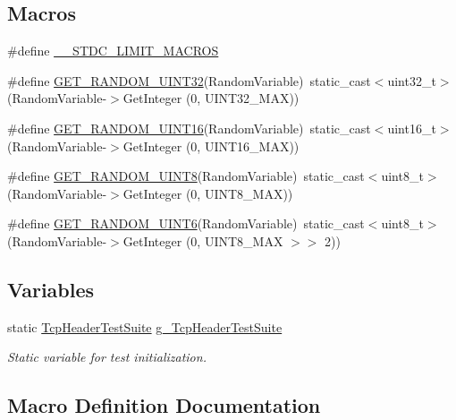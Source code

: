 \subsection*{Macros}
\begin{DoxyCompactItemize}
\item 
\#define \hyperlink{tcp-header-test_8cc_aeb7e7a856ab7a794b05b6b63ef36ea3e}{\+\_\+\+\_\+\+S\+T\+D\+C\+\_\+\+L\+I\+M\+I\+T\+\_\+\+M\+A\+C\+R\+OS}
\item 
\#define \hyperlink{tcp-header-test_8cc_a18a01a3931e95a479db69a3aa5ecb86b}{G\+E\+T\+\_\+\+R\+A\+N\+D\+O\+M\+\_\+\+U\+I\+N\+T32}(Random\+Variable)~static\+\_\+cast$<$uint32\+\_\+t$>$ (Random\+Variable-\/$>$Get\+Integer (0, U\+I\+N\+T32\+\_\+\+M\+AX))
\item 
\#define \hyperlink{tcp-header-test_8cc_a5ad9b850834e357fa799fbd61fdae700}{G\+E\+T\+\_\+\+R\+A\+N\+D\+O\+M\+\_\+\+U\+I\+N\+T16}(Random\+Variable)~static\+\_\+cast$<$uint16\+\_\+t$>$ (Random\+Variable-\/$>$Get\+Integer (0, U\+I\+N\+T16\+\_\+\+M\+AX))
\item 
\#define \hyperlink{tcp-header-test_8cc_a80bde0d6d461cee23c8fa13d12d15e16}{G\+E\+T\+\_\+\+R\+A\+N\+D\+O\+M\+\_\+\+U\+I\+N\+T8}(Random\+Variable)~static\+\_\+cast$<$uint8\+\_\+t$>$ (Random\+Variable-\/$>$Get\+Integer (0, U\+I\+N\+T8\+\_\+\+M\+AX))
\item 
\#define \hyperlink{tcp-header-test_8cc_a238b3bcc0c1ee2f728a775153422d52a}{G\+E\+T\+\_\+\+R\+A\+N\+D\+O\+M\+\_\+\+U\+I\+N\+T6}(Random\+Variable)~static\+\_\+cast$<$uint8\+\_\+t$>$ (Random\+Variable-\/$>$Get\+Integer (0, U\+I\+N\+T8\+\_\+\+M\+AX $>$$>$ 2))
\end{DoxyCompactItemize}
\subsection*{Variables}
\begin{DoxyCompactItemize}
\item 
static \hyperlink{classTcpHeaderTestSuite}{Tcp\+Header\+Test\+Suite} \hyperlink{tcp-header-test_8cc_a0e9b4c960e624eb8c6d054eb34af8fec}{g\+\_\+\+Tcp\+Header\+Test\+Suite}
\begin{DoxyCompactList}\small\item\em Static variable for test initialization. \end{DoxyCompactList}\end{DoxyCompactItemize}


\subsection{Macro Definition Documentation}
